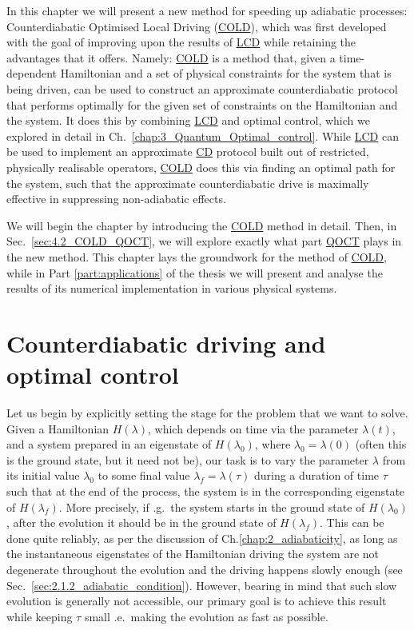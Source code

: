 \documentclass[a4paper,oneside,11pt]{book}
\newcommand{\acrref}[1]{\hyperref[acr:#1]{#1}}
\begin{document}
In this chapter we will present a new method for speeding up adiabatic processes: Counterdiabatic Optimised Local Driving (\acrref{COLD}), which was first developed with the goal of improving upon the results of \acrref{LCD} while retaining the advantages that it offers. Namely: \acrref{COLD} is a method that, given a time-dependent Hamiltonian and a set of physical constraints for the system that is being driven, can be used to construct an approximate counterdiabatic protocol that performs optimally for the given set of constraints on the Hamiltonian and the system. It does this by combining \acrref{LCD} and optimal control, which we explored in detail in Ch.~\ref{chap:3_Quantum_Optimal_control}. While \acrref{LCD} can be used to implement an approximate \acrref{CD} protocol built out of restricted, physically realisable operators, \acrref{COLD} does this via finding an optimal path for the system, such that the approximate counterdiabatic drive is maximally effective in suppressing non-adiabatic effects.

We will begin the chapter by introducing the \acrref{COLD} method in detail. Then, in Sec.~\ref{sec:4.2_COLD_QOCT}, we will explore exactly what part \acrref{QOCT} plays in the new method. This chapter lays the groundwork for the method of \acrref{COLD}, while in Part \ref{part:applications} of the thesis we will present and analyse the results of its numerical implementation in various physical systems.

\section{Counterdiabatic driving and optimal control}\label{sec:4.1_COLD}

Let us begin by explicitly setting the stage for the problem that we want to solve. Given a Hamiltonian $H(\lambda)$, which depends on time via the parameter $\lambda(t)$, and a system prepared in an eigenstate of $H(\lambda_0)$, where $\lambda_0 = \lambda(0)$ (often this is the ground state, but it need not be), our task is to vary the parameter $\lambda$ from its initial value $\lambda_0$ to some final value $\lambda_f = \lambda(\tau)$ during a duration of time $\tau$ such that at the end of the process, the system is in the corresponding eigenstate of $H(\lambda_f)$. More precisely, if \@e.g.~the system starts in the ground state of $H(\lambda_0)$, after the evolution it should be in the ground state of $H(\lambda_f)$. This can be done quite reliably, as per the discussion of Ch.\ref{chap:2_adiabaticity}, as long as the instantaneous eigenstates of the Hamiltonian driving the system are not degenerate throughout the evolution and the driving happens slowly enough (see Sec.~\ref{sec:2.1.2_adiabatic_condition}). However, bearing in mind that such slow evolution is generally not accessible, our primary goal is to achieve this result while keeping $\tau$ small \@i.e.~making the evolution as fast as possible. 
\end{document}
